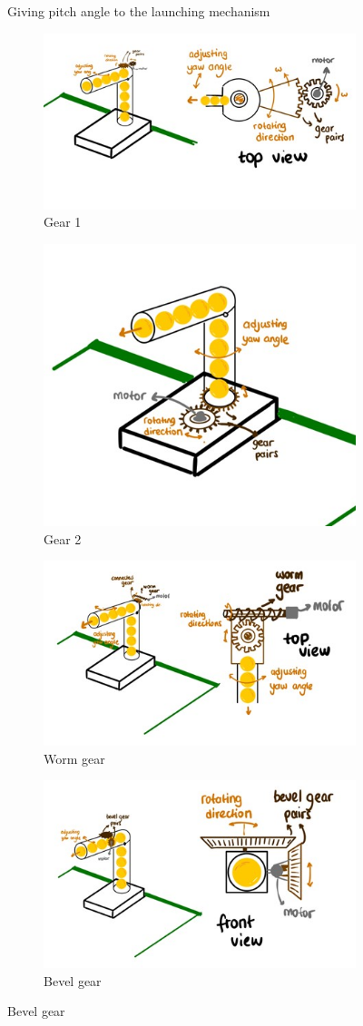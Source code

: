 \documentclass[12pt]{report}
\begin{document}
\begin{appendices}
\begin{figure}[H]
\caption{Giving pitch angle to the launching mechanism  }
\label{fig:pitch}
\end{figure}


\begin{figure}[H]
\centering
\begin{subfigure}{.5\textwidth}
  \centering
  \includegraphics[width=.4\linewidth]{gear1yaw.jpg}
  \caption{Gear 1}
  \label{fig:gear1}
\end{subfigure}%
\begin{subfigure}{.5\textwidth}
  \centering
  \includegraphics[width=.4\linewidth]{gear2yaw.jpg}
  \caption{Gear 2}
  \label{fig:gear2}
\end{subfigure}
\begin{subfigure}{.5\textwidth}
  \centering
  \includegraphics[width=.4\linewidth]{wormyaw.jpg}
  \caption{Worm gear}
  \label{fig:worm_yaw}
\end{subfigure}%
\begin{subfigure}{.5\textwidth}
  \centering
  \includegraphics[width=.4\linewidth]{bevelyaw.jpg}
  \caption{Bevel gear}
  \label{fig:bevel_yaw}
\end{subfigure}%


\end{figure}
\end{appendices}
\end{document}
